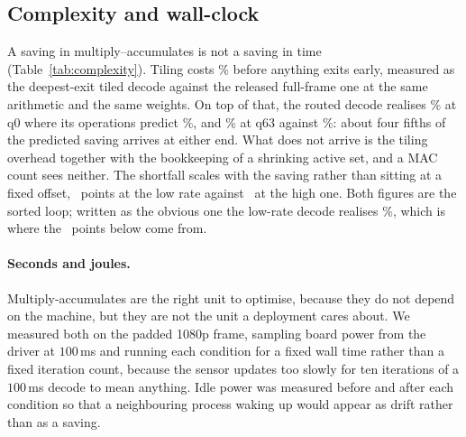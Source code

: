 \documentclass[10pt,twocolumn,letterpaper]{article}
\newcommand{\dB}{\,dB}
\begin{document}
\subsection{Complexity and wall-clock}
\label{sec:wallclock}

\begin{table}[t]
\centering

\caption{\textbf{Decoder complexity} at 1080p. Our deepest exit costs slightly
more than the released decoder because it still pays the deblocking filter; that
$\DeepestExitCost$, not $1.0$, is what every saving in this paper is \emph{not} divided by.
Wall-clock is the sorted loop of Section~\ref{sec:wallclock}.}
\label{tab:complexity}
\end{table}

\begin{table}[t]
\centering

\caption{\textbf{Wall-clock}, 1080p, median of 40 interleaved iterations on one
NVIDIA RTX A6000 with a $300$\,W board limit, PyTorch $2.6.0$ and CUDA $12.4$, single precision, one frame per iteration after $20$ warm-up iterations, at the $0.1\dB$ operating point. ``MACs'' is what the arithmetic
predicts; ``measured'' is the sorted per-tile loop of
Section~\ref{sec:wallclock}.}
\label{tab:latency}
\end{table}

A saving in multiply--accumulates is not a saving in time (Table~\ref{tab:complexity}). Tiling costs
\TilingOverhead\% before anything exits early, measured as the deepest-exit
tiled decode against the released full-frame one at the same arithmetic and the
same weights. On top of that, the routed decode realises \WallSorted\% at q0 where its operations predict
\WallPredicted\%, and \WallHighMeasured\% at q63 against
\WallHighPredicted\%: about four fifths of the predicted saving arrives at
either end. What does not arrive is the tiling overhead together with the
bookkeeping of a shrinking active set, and a MAC count sees neither. The
shortfall scales with the saving rather than sitting at a fixed offset,
\WallShortLow\ points at the low rate against \WallShortHigh\ at the high
one. Both figures are the sorted loop; written as the obvious one the
low-rate decode realises \WallMasked\%, which is where the
\WallSortedGain\ points below come from.

\paragraph{Seconds and joules.} Multiply-accumulates are the right unit to
optimise, because they do not depend on the machine, but they are not the unit a
deployment cares about. We measured both on the padded 1080p frame, sampling
board power from the driver at $100$\,ms and running each condition for a fixed
wall time rather than a fixed iteration count, because the sensor updates too
slowly for ten iterations of a $100$\,ms decode to mean anything. Idle power was
measured before and after each condition so that a neighbouring process waking up
would appear as drift rather than as a saving.
\end{document}

